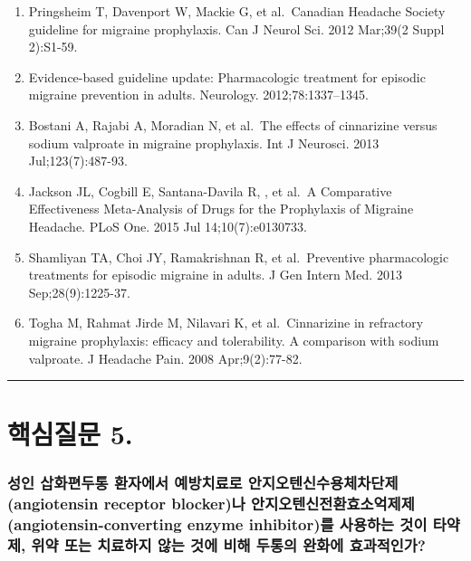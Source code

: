 \documentclass[]{book}
\begin{document}
\begin{enumerate}
\def\labelenumi{\arabic{enumi}.}
\item
  Pringsheim T, Davenport W, Mackie G, et al.~Canadian Headache Society guideline for migraine prophylaxis. Can J Neurol Sci. 2012 Mar;39(2 Suppl 2):S1-59.
\item
  Evidence-based guideline update: Pharmacologic treatment for episodic migraine prevention in adults. Neurology. 2012;78:1337--1345.
\item
  Bostani A, Rajabi A, Moradian N, et al.~The effects of cinnarizine versus sodium valproate in migraine prophylaxis. Int J Neurosci. 2013 Jul;123(7):487-93.
\item
  Jackson JL, Cogbill E, Santana-Davila R, , et al.~A Comparative Effectiveness Meta-Analysis of Drugs for the Prophylaxis of Migraine Headache. PLoS One. 2015 Jul 14;10(7):e0130733.
\item
  Shamliyan TA, Choi JY, Ramakrishnan R, et al.~Preventive pharmacologic treatments for episodic migraine in adults. J Gen Intern Med. 2013 Sep;28(9):1225-37.
\item
  Togha M, Rahmat Jirde M, Nilavari K, et al.~Cinnarizine in refractory migraine prophylaxis: efficacy and tolerability. A comparison with sodium valproate. J Headache Pain. 2008 Apr;9(2):77-82.
\end{enumerate}

\begin{center}\rule{0.5\linewidth}{\linethickness}\end{center}

\hypertarget{section-17}{%
\section{핵심질문 5.}\label{section-17}}

\hypertarget{angiotensin-receptor-blocker-angiotensin-converting-enzyme-inhibitor------------}{%
\subsubsection*{성인 삽화편두통 환자에서 예방치료로 안지오텐신수용체차단제(angiotensin receptor blocker)나 안지오텐신전환효소억제제(angiotensin-converting enzyme inhibitor)를 사용하는 것이 타약제, 위약 또는 치료하지 않는 것에 비해 두통의 완화에 효과적인가?}\label{angiotensin-receptor-blocker-angiotensin-converting-enzyme-inhibitor------------}}
\end{document}
